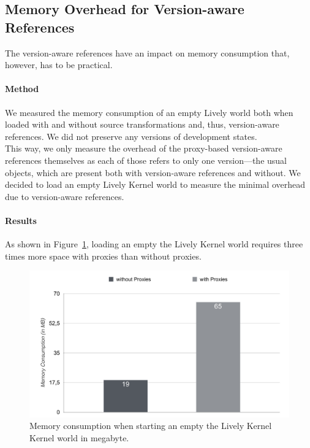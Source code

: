 \subsection{Memory Overhead for Version-aware References}

The version-aware references have an impact on memory consumption that, however, has to be practical.

\paragraph{Method}
We measured the memory consumption of an empty Lively world both when loaded with and without source transformations and, thus, version-aware references.
We did not preserve any versions of development states.\\
This way, we only measure the overhead of the proxy-based version-aware references themselves as each of those refers to only one version---the usual objects, which are present both with version-aware references and without.
We decided to load an empty Lively Kernel world to measure the minimal overhead due to version-aware references.


\paragraph{Results}
As shown in Figure~\ref{fig:MemoryOverheadForReferences}, loading an empty the Lively Kernel world requires three times more space with proxies than without proxies.

\begin{figure}[h]
    \centering
    \includegraphics[width=\textwidth]{figures/6_evaluation/1_memoryOverhead.pdf}
    \caption{Memory consumption when starting an empty the Lively Kernel Kernel world in megabyte.}
    \label{fig:MemoryOverheadForReferences}
\end{figure}

